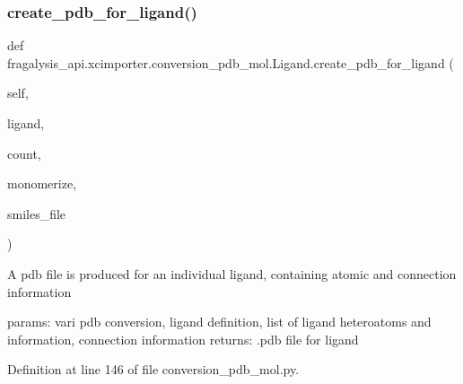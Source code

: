 \subsubsection{\texorpdfstring{create\+\_\+pdb\+\_\+for\+\_\+ligand()}{create\_pdb\_for\_ligand()}}
{\footnotesize\ttfamily def fragalysis\+\_\+api.\+xcimporter.\+conversion\+\_\+pdb\+\_\+mol.\+Ligand.\+create\+\_\+pdb\+\_\+for\+\_\+ligand (\begin{DoxyParamCaption}\item[{}]{self,  }\item[{}]{ligand,  }\item[{}]{count,  }\item[{}]{monomerize,  }\item[{}]{smiles\+\_\+file }\end{DoxyParamCaption})}

\begin{DoxyVerb}A pdb file is produced for an individual ligand, containing atomic and connection information

params: vari pdb conversion, ligand definition, list of ligand heteroatoms and information, connection information
returns: .pdb file for ligand
\end{DoxyVerb}
 

Definition at line 146 of file conversion\+\_\+pdb\+\_\+mol.\+py.


